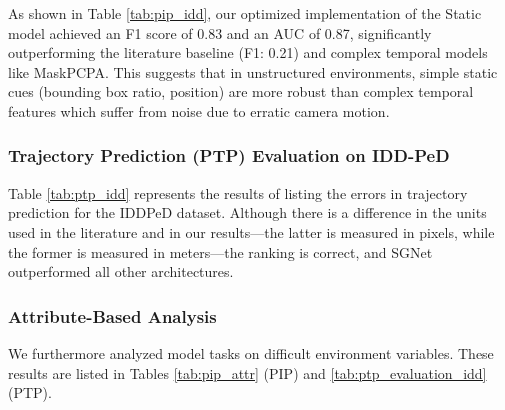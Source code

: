 \documentclass[12pt, a4paper]{article}
\begin{document}
As shown in Table \ref{tab:pip_idd}, our optimized implementation of the Static model achieved an F1 score of 0.83 and an AUC of 0.87, significantly outperforming the literature baseline (F1: 0.21) and complex temporal models like MaskPCPA. This suggests that in unstructured environments, simple static cues (bounding box ratio, position) are more robust than complex temporal features which suffer from noise due to erratic camera motion.

\subsubsection{Trajectory Prediction (PTP) Evaluation on IDD-PeD}
Table \ref{tab:ptp_idd} represents the results of listing the errors in trajectory prediction for the IDDPeD dataset. Although there is a difference in the units used in the literature and in our results—the latter is measured in pixels, while the former is measured in meters—the ranking is correct, and SGNet \cite{wang2022stepwise} outperformed all other architectures.

\begin{table}[h]
\centering
\small %
\setlength{\tabcolsep}{10pt}
\caption{Evaluation of PTP baselines on IDD-PeD. Comparison of MSE, C-MSE, and CF-MSE.}
\label{tab:ptp_idd}
\end{table}




\subsubsection{Attribute-Based Analysis}
We furthermore analyzed model tasks on difficult environment variables. These results are listed in Tables \ref{tab:pip_attr} (PIP) and \ref{tab:ptp_evaluation_idd} (PTP).
\end{document}
